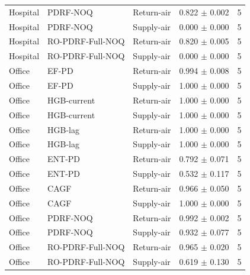 \begin{tabular}{lllrr}
Hospital & PDRF-NOQ & Return-air & 0.822 $\pm$ 0.002 & 5 \\
Hospital & PDRF-NOQ & Supply-air & 0.000 $\pm$ 0.000 & 5 \\
Hospital & RO-PDRF-Full-NOQ & Return-air & 0.820 $\pm$ 0.005 & 5 \\
Hospital & RO-PDRF-Full-NOQ & Supply-air & 0.000 $\pm$ 0.000 & 5 \\
Office & EF-PD & Return-air & 0.994 $\pm$ 0.008 & 5 \\
Office & EF-PD & Supply-air & 1.000 $\pm$ 0.000 & 5 \\
Office & HGB-current & Return-air & 1.000 $\pm$ 0.000 & 5 \\
Office & HGB-current & Supply-air & 1.000 $\pm$ 0.000 & 5 \\
Office & HGB-lag & Return-air & 1.000 $\pm$ 0.000 & 5 \\
Office & HGB-lag & Supply-air & 1.000 $\pm$ 0.000 & 5 \\
Office & ENT-PD & Return-air & 0.792 $\pm$ 0.071 & 5 \\
Office & ENT-PD & Supply-air & 0.532 $\pm$ 0.117 & 5 \\
Office & CAGF & Return-air & 0.966 $\pm$ 0.050 & 5 \\
Office & CAGF & Supply-air & 1.000 $\pm$ 0.000 & 5 \\
Office & PDRF-NOQ & Return-air & 0.992 $\pm$ 0.002 & 5 \\
Office & PDRF-NOQ & Supply-air & 0.932 $\pm$ 0.077 & 5 \\
Office & RO-PDRF-Full-NOQ & Return-air & 0.965 $\pm$ 0.020 & 5 \\
Office & RO-PDRF-Full-NOQ & Supply-air & 0.619 $\pm$ 0.130 & 5 \\
\bottomrule
\end{tabular}